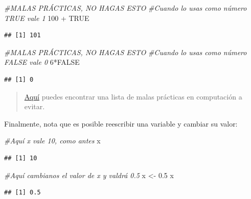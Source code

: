 \documentclass[
]{book}
\newenvironment{Shaded}{\begin{snugshade}}{\end{snugshade}}
\newcommand{\CommentTok}[1]{\textcolor[rgb]{0.56,0.35,0.01}{\textit{#1}}}
\newcommand{\ConstantTok}[1]{\textcolor[rgb]{0.00,0.00,0.00}{#1}}
\newcommand{\DecValTok}[1]{\textcolor[rgb]{0.00,0.00,0.81}{#1}}
\newcommand{\FloatTok}[1]{\textcolor[rgb]{0.00,0.00,0.81}{#1}}
\newcommand{\NormalTok}[1]{#1}
\newcommand{\OtherTok}[1]{\textcolor[rgb]{0.56,0.35,0.01}{#1}}
\newcommand{\SpecialCharTok}[1]{\textcolor[rgb]{0.00,0.00,0.00}{#1}}
\begin{document}
\begin{Shaded}
\begin{Highlighting}[]
\CommentTok{\#MALAS PRÁCTICAS, NO HAGAS ESTO}
\CommentTok{\#Cuando lo usas como número TRUE vale 1}
\DecValTok{100} \SpecialCharTok{+} \ConstantTok{TRUE}
\end{Highlighting}
\end{Shaded}

\begin{verbatim}
## [1] 101
\end{verbatim}

\begin{Shaded}
\begin{Highlighting}[]
\CommentTok{\#MALAS PRÁCTICAS, NO HAGAS ESTO}
\CommentTok{\#Cuando lo usas como número FALSE vale 0}
\DecValTok{6}\SpecialCharTok{*}\ConstantTok{FALSE}
\end{Highlighting}
\end{Shaded}

\begin{verbatim}
## [1] 0
\end{verbatim}

\begin{quote}
\href{https://medium.com/mindorks/common-bad-programming-practices-7fb470ed74d2}{Aquí} puedes encontrar una lista de malas prácticas en computación a evitar.
\end{quote}

Finalmente, nota que es posible reescribir una variable y cambiar su valor:

\begin{Shaded}
\begin{Highlighting}[]
\CommentTok{\#Aquí x vale 10, como antes}
\NormalTok{x}
\end{Highlighting}
\end{Shaded}

\begin{verbatim}
## [1] 10
\end{verbatim}

\begin{Shaded}
\begin{Highlighting}[]
\CommentTok{\#Aquí cambianos el valor de x y valdrá 0.5}
\NormalTok{x }\OtherTok{\textless{}{-}} \FloatTok{0.5}
\NormalTok{x}
\end{Highlighting}
\end{Shaded}

\begin{verbatim}
## [1] 0.5
\end{verbatim}
\end{document}
